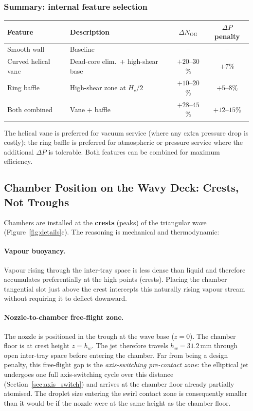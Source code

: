 \documentclass[11pt,letterpaper]{article}
\begin{document}
\subsubsection{Summary: internal feature selection}

\begin{center}
\begin{tabular}{llcc}
\toprule
Feature & Description & $\Delta N_{\mathrm{OG}}$ & $\Delta P$ penalty \\
\midrule
Smooth wall          & Baseline                             & --            & --         \\
Curved helical vane  & Dead-core elim.\ + high-shear base   & $+20$--$30$\% & $+7$\%     \\
Ring baffle          & High-shear zone at $H_c/2$           & $+10$--$20$\% & $+5$--$8$\%  \\
Both combined        & Vane + baffle                        & $+28$--$45$\% & $+12$--$15$\% \\
\bottomrule
\end{tabular}
\end{center}

The helical vane is preferred for vacuum service (where any extra
pressure drop is costly); the ring baffle is preferred for
atmospheric or pressure service where the additional $\Delta P$ is
tolerable.  Both features can be combined for maximum efficiency.

\subsection{Chamber Position on the Wavy Deck: Crests, Not Troughs}
\label{sec:crest_position}

Chambers are installed at the \textbf{crests} (peaks) of the triangular wave
(Figure~\ref{fig:details}c).  The reasoning is mechanical and thermodynamic:

\paragraph{Vapour buoyancy.}
Vapour rising through the inter-tray space is less dense than liquid and
therefore accumulates preferentially at the high points (crests).  Placing
the chamber tangential slot just above the crest intercepts this
naturally rising vapour stream without requiring it to deflect downward.

\paragraph{Nozzle-to-chamber free-flight zone.}
The nozzle is positioned in the trough at the wave base ($z = 0$).
The chamber floor is at crest height $z = h_w$.  The jet therefore
travels $h_w = 31.2$\,mm through open inter-tray space before entering
the chamber.  Far from being a design penalty, this free-flight gap is
the \emph{axis-switching pre-contact zone}: the elliptical jet undergoes
one full axis-switching cycle over this distance
(Section~\ref{sec:axis_switch}) and arrives at the chamber floor
already partially atomised.  The droplet size entering the swirl
contact zone is consequently smaller than it would be if the nozzle
were at the same height as the chamber floor.
\end{document}
